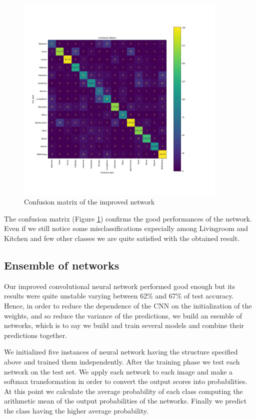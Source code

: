 \documentclass[12pt, a4paper]{report}
\begin{document}
\begin{figure}[h!]
	\centering
	\includegraphics[width=0.9\textwidth]{img/final_cmatrix}
	\caption{Confusion matrix of the improved network}
	\label{fig:improvedcmatrix}
\end{figure}

The confusion matrix (Figure \ref{fig:improvedcmatrix}) confirms the good performances of the network. Even if we still notice some misclassifications expecially among Livingroom and Kitchen and few other classes we are quite satisfied with the obtained result.

\subsection*{Ensemble of networks}

Our improved convolutional neural network performed good enough but its results were quite unstable varying between 62\% and 67\% of test accuracy. Hence, in order to reduce the dependence of the CNN on the initialization of the weights, and so reduce the variance of the predictions, we build an esemble of networks, which is to say we build and train several models and combine their predictions together.

We initialized five instances of neural network having the structure specified above and trained them independently. After the training phase we test each network on the test set. We apply each network to each image and make a softmax transformation in order to convert the output scores into probabilities. At this point we calculate the average probability of each class computing the arithmetic mean of the output probabilities of the networks. Finally we predict the class having the higher average probability.
\end{document}
